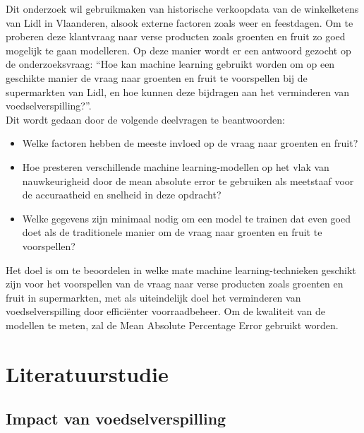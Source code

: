 \documentclass{hogent-article}
\begin{document}
   Dit onderzoek wil gebruikmaken van historische verkoopdata van de winkelketens van Lidl in Vlaanderen, alsook externe factoren zoals weer en feestdagen. Om te proberen deze klantvraag naar verse producten zoals groenten en fruit zo goed mogelijk te gaan modelleren. Op deze manier wordt er een antwoord gezocht op de onderzoeksvraag: ``Hoe kan machine learning gebruikt worden om op een geschikte manier de vraag naar groenten en fruit te voorspellen bij de supermarkten van Lidl, en hoe kunnen deze bijdragen aan het verminderen van voedselverspilling?''.\\
    
    Dit wordt gedaan door de volgende deelvragen te beantwoorden:
    
    \begin{itemize}
        
        \item Welke factoren hebben de meeste invloed op de vraag naar groenten en fruit?
        
        \item Hoe presteren verschillende machine learning-modellen op het vlak van nauwkeurigheid door de mean absolute error te gebruiken als meetstaaf voor de accuraatheid en snelheid in deze opdracht?
        
        \item Welke gegevens zijn minimaal nodig om een model te trainen dat even goed doet als de traditionele manier om de vraag naar groenten en fruit te voorspellen?
        
    \end{itemize} 
    
    Het doel is om te beoordelen in welke mate machine learning-technieken geschikt zijn voor het voorspellen van de vraag naar verse producten zoals groenten en fruit in supermarkten, met als uiteindelijk doel het verminderen van voedselverspilling door efficiënter voorraadbeheer. Om de kwaliteit van de modellen te meten, zal de Mean Absolute Percentage Error gebruikt worden.
    
    \section{Literatuurstudie}%
    
    \label{sec:literatuurstudie}
    
    \subsection{Impact van voedselverspilling}
    
\end{document}
